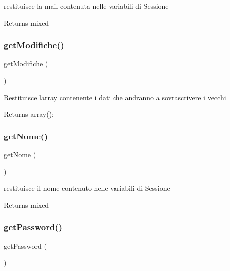restituisce la mail contenuta nelle variabili di Sessione

\begin{DoxyReturn}{Returns}
mixed 
\end{DoxyReturn}
\mbox{\label{class_v_utente_ad153372cfab6f86800a89b5a378d9760}} 
\subsubsection{\texorpdfstring{get\+Modifiche()}{getModifiche()}}
{\footnotesize\ttfamily get\+Modifiche (\begin{DoxyParamCaption}{ }\end{DoxyParamCaption})}

Restituisce l\textquotesingle{}array contenente i dati che andranno a sovrascrivere i vecchi

\begin{DoxyReturn}{Returns}
array(); 
\end{DoxyReturn}
\mbox{\label{class_v_utente_a67fa74a47af3f2f9eeced7c37c2ef0d3}} 
\subsubsection{\texorpdfstring{get\+Nome()}{getNome()}}
{\footnotesize\ttfamily get\+Nome (\begin{DoxyParamCaption}{ }\end{DoxyParamCaption})}

restituisce il nome contenuto nelle variabili di Sessione

\begin{DoxyReturn}{Returns}
mixed 
\end{DoxyReturn}
\mbox{\label{class_v_utente_a04e0957baeb7acde9c0c86556da2d43f}} 
\subsubsection{\texorpdfstring{get\+Password()}{getPassword()}}
{\footnotesize\ttfamily get\+Password (\begin{DoxyParamCaption}{ }\end{DoxyParamCaption})}

